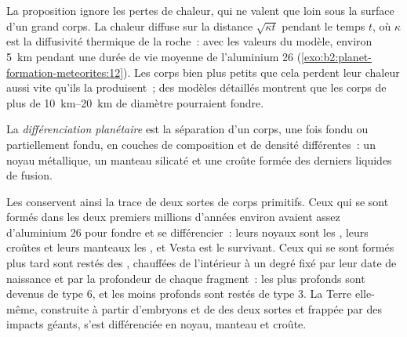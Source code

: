 \begin{omfigure}
\par{}
\end{omfigure}

La proposition ignore les pertes de chaleur, qui ne valent que loin sous la surface d'un grand corps. La
chaleur diffuse sur la distance $\sqrt{\kappa t}$ pendant le temps $t$, où $\kappa$ est la diffusivité
thermique de la roche~: avec les valeurs du modèle, environ \qty{5}{km} pendant une durée de vie moyenne de
l'aluminium 26 (\cref{exo:b2:planet-formation-meteorites:12}). Les corps bien plus petits que cela perdent leur
chaleur aussi vite qu'ils la produisent~; des modèles détaillés montrent que les corps de plus de
\qtyrange{10}{20}{km} de diamètre pourraient fondre.

\begin{definition}
\label{def:b2:planet-formation-meteorites:differentiation}
La \emph{différenciation planétaire} est la
séparation d'un corps, une fois fondu ou partiellement fondu, en couches de
composition et de densité différentes~: un noyau métallique, un manteau silicaté et
une croûte formée des derniers liquides de fusion.
\end{definition}

Les  conservent ainsi la trace de deux sortes de corps primitifs. Ceux qui se sont formés dans
les deux premiers millions d'années environ avaient assez d'aluminium 26 pour fondre et se
différencier~: leurs noyaux sont les , leurs croûtes et leurs manteaux les ,
et Vesta est le survivant. Ceux qui se sont formés plus tard sont restés des , chauffées de
l'intérieur à un degré fixé par leur date de naissance et par la profondeur de chaque fragment~: les
plus profonds sont devenus de type 6, et les moins profonds sont restés de type 3. La Terre elle-même,
construite à partir d'embryons et de  des deux sortes et frappée par des impacts géants,
s'est différenciée en noyau, manteau et croûte.


